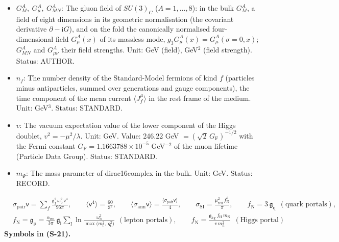 \documentclass[
  10pt,
]{article}
\begin{document}
\begin{itemize}
  the QCD vacuum, a thermal value in the plasma). Unit: GeV\(^4\).
  Status: STANDARD.
\item
  \(G^A_M,\ G^A_\mu,\ G^A_{MN}\): The gluon field of \(SU(3)_C\)
  (\(A = 1, \dots, 8\)): in the bulk \(G^A_M\), a field of eight
  dimensions in its geometric normalisation (the covariant derivative
  \(\partial - \mathrm{i}G\)), and on the fold the canonically
  normalised four-dimensional field \(G^A_\mu(x)\) of its massless mode,
  \(g_3G^A_\mu(x) = G^A_\mu(\sigma = 0, x)\); \(G^A_{MN}\) and
  \(G^A_{\mu\nu}\) their field strengths. Unit: GeV (field), GeV\(^2\)
  (field strength). Status: AUTHOR.
\item
  \(n_f\): The number density of the Standard-Model fermions of kind
  \(f\) (particles minus antiparticles, summed over generations and
  gauge components), the time component of the mean current
  \(\langle J_f^\mu\rangle\) in the rest frame of the medium. Unit:
  GeV\(^3\). Status: STANDARD.
\item
  \(v\): The vacuum expectation value of the lower component of the
  Higgs doublet, \(v^2 = -\mu^2/\lambda\). Unit: GeV. Value: 246.22 GeV
  \(= (\sqrt2\,G_{\mathrm{F}})^{-1/2}\) with the Fermi constant
  \(G_{\mathrm{F}} = 1.1663788\times10^{-5}\) GeV\(^{-2}\) of the muon
  lifetime (Particle Data Group). Status: STANDARD.
\item
  \(m_\Psi\): The mass parameter of dirac16complex in the bulk. Unit:
  GeV. Status: RECORD.
\end{itemize}

\[
\begin{aligned}
&\sigma_{\mathrm{pair}}\mathsf{v} = \sum_f\frac{\mathfrak{g}_f^2\,\omega_{\mathrm{b}}^2\,\mathsf{v}^4}{96\pi},\qquad \langle\mathsf{v}^4\rangle = \frac{60}{\mathsf{x}^2},\qquad
 \langle\sigma_{\mathrm{ann}}\mathsf{v}\rangle = \frac{\langle\sigma_{\mathrm{pair}}\mathsf{v}\rangle}{4},\qquad
 \sigma_{\mathrm{SI}} = \frac{\mu_{\mathrm{red}}^2\,f_{\mathrm{N}}^2}{\pi},\qquad f_{\mathrm{N}} = 3\,\mathfrak{g}_{\mathrm{q}}\ \ (\text{quark portals}),\\
&f_{\mathrm{N}} = \mathfrak{g}_{\mathrm{p}} = \frac{\alpha_{\mathrm{em}}}{3\pi}\,\mathfrak{g}_{\mathrm{l}}\sum_{l}\ln\frac{\omega_{\mathrm{b}}^2}{\max\big(m_l^2,\ q_{\mathrm{t}}^2\big)}\ \ (\text{lepton portals}),\qquad
 f_{\mathrm{N}} = \frac{\mathfrak{g}_{h\chi}\,f_{\mathrm{H}}\,m_{\mathrm{N}}}{v\,m_h^2}\ \ (\text{Higgs portal})
\end{aligned} \tag{S-21}
\] \textbf{Symbols in (S-21).}
\end{document}
